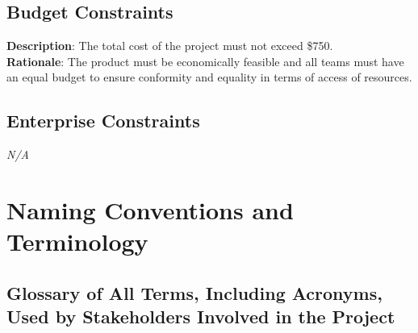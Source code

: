 \documentclass[12pt]{article}
\begin{document}
\subsection{Budget Constraints}
\textbf{Description}: The total cost of the project must not exceed \$750.\\
\textbf{Rationale}: The product must be economically feasible and all teams must have an equal budget to ensure conformity and equality in terms of access of resources.

\subsection{Enterprise Constraints}
\emph{N/A}

\section{Naming Conventions and Terminology}

\subsection{Glossary of All Terms, Including Acronyms, Used by Stakeholders Involved in the Project}
\end{document}
